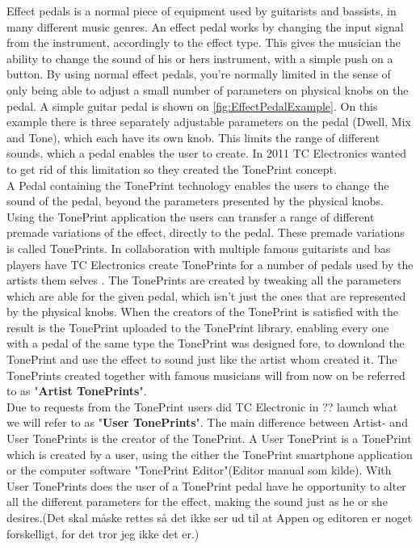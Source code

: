 Effect pedals is a normal piece of equipment used by guitarists and bassists, in many different music genres. An effect pedal works by changing the input signal from the instrument, accordingly to the effect type. This gives the musician the ability to change the sound of his or hers instrument, with a simple push on a button. By using normal effect pedals, you're normally limited in the sense of only being able to adjust a small number of parameters on physical knobs on the pedal. A simple guitar pedal is shown on \autoref{fig:EffectPedalExample}. On this example there is three separately adjustable parameters on the pedal (Dwell, Mix and Tone), which each have its own knob. This limits the range of different sounds, which a pedal enables the user to create. In 2011 TC Electronics wanted to get rid of this limitation so they created the TonePrint concept.\\
A Pedal containing the TonePrint technology enables the users to change the sound of the pedal, beyond the parameters presented by the physical knobs. Using the TonePrint application the users can transfer a range of different premade variations of the effect, directly to the pedal. These premade variations is called TonePrints. In collaboration with multiple famous guitarists and bas players have TC Electronics create TonePrints for a number of pedals used by the artists them selves \parencite{PDF:TonePrintAnalyse}. The TonePrints are created by tweaking all the parameters which are able for the given pedal, which isn't just the ones that are represented by the physical knobs. When the creators of the TonePrint is satisfied with the result is the TonePrint uploaded to the TonePrint library, enabling every one with a pedal of the same type the TonePrint was designed fore, to download the TonePrint and use the effect to sound just like the artist whom created it. The TonePrints created together with famous musicians will from now on be referred to as "\textbf{Artist TonePrints}". \\
Due to requests from the TonePrint users did TC Electronic in ?? launch what we will refer to as "\textbf{User TonePrints}". The main difference between Artist- and User TonePrints is the creator of the TonePrint. A User TonePrint is a TonePrint which is created by a user, using the either the TonePrint smartphone application or the computer software "TonePrint Editor"(Editor manual som kilde). With User TonePrints does the user of a TonePrint pedal have he opportunity to alter all the different parameters for the effect, making the sound just as he or she desires.(Det skal måske rettes så det ikke ser ud til at Appen og editoren er noget forskelligt, for det tror jeg ikke det er.)


